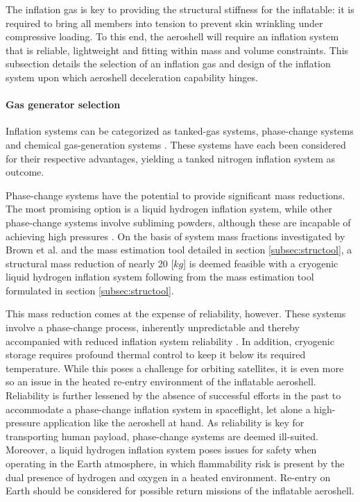 The inflation gas is key to providing the structural stiffness for the inflatable: it is required to bring all members into tension to prevent skin wrinkling under compressive loading. To this end, the aeroshell will require an inflation system that is reliable, lightweight and fitting within mass and volume constraints. This subsection details the selection of an inflation gas and design of the inflation system upon which aeroshell deceleration capability hinges.

\paragraph{Gas generator selection}
Inflation systems can be categorized as tanked-gas systems, phase-change systems and chemical gas-generation systems \cite{Jenkins2001}. These systems have each been considered for their respective advantages, yielding a tanked nitrogen inflation system as outcome. 

Phase-change systems have the potential to provide significant mass reductions. The most promising option is a liquid hydrogen inflation system, while other phase-change systems involve subliming powders, although these are incapable of achieving high pressures \cite{Freeland1998}.  On the basis of system mass fractions investigated by Brown et al. \cite{Brown2009} and the mass estimation tool detailed in section \ref{subsec:structool}, a structural mass reduction of nearly 20 [$kg$] is deemed feasible with a cryogenic liquid hydrogen inflation system following from the mass estimation tool formulated in section \ref{subsec:structool}. 


This mass reduction comes at the expense of reliability, however. These systems involve a phase-change process, inherently unpredictable and thereby accompanied with reduced inflation system reliability \cite{Jenkins2001}. In addition, cryogenic storage requires profound thermal control to keep it below its required temperature. While this poses a challenge for orbiting satellites, it is even more so an issue in the heated re-entry environment of the inflatable aeroshell. Reliability is further lessened by the absence of successful efforts in the past to accommodate a phase-change inflation system in spaceflight, let alone a high-pressure application like the aeroshell at hand. As reliability is key for transporting human payload, phase-change systems are deemed ill-suited. Moreover, a liquid hydrogen inflation system poses issues for safety when operating in the Earth atmosphere, in which flammability risk is present by the dual presence of hydrogen and oxygen in a heated environment. Re-entry on Earth should be considered for possible return missions of the inflatable aeroshell.


